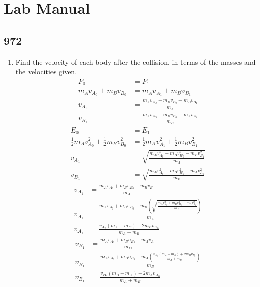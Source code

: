 \documentclass{article}
\begin{document}
\section{Lab Manual}

\subsection{972}

\begin{enumerate}[label = \textbf{(\alph*)}]
	\item Find the velocity of each body after the collision, in terms of the masses and the velocities given.
		\begin{align*}
			P_0 & = P_1 \\
			m_Av_{A_0} + m_Bv_{B_0} & = m_Av_{A_1} + m_Bv_{B_1} \\
			v_{A_1} & = \frac{ m_Av_{A_0} + m_Bv_{B_0} - m_Bv_{B_1} }{ m_A } \\
			v_{B_1} & = \frac{ m_Av_{A_0} + m_Bv_{B_0} - m_Av_{A_1} }{ m_B }
		\end{align*}
		\begin{align*}
			E_0 & = E_1 \\
			\frac{1}{2}m_Av_{A_0}^2 + \frac{1}{2}m_Bv_{B_0}^2 & = \frac{1}{2}m_Av_{A_1}^2 + \frac{1}{2}m_Bv_{B_1}^2 \\
			v_{A_1} & = \sqrt{ \frac{ m_Av_{A_0}^2 + m_Bv_{B_0}^2 - m_Bv_{B_1}^2 }{ m_A } } \\
			v_{B_1} & = \sqrt{ \frac{ m_Av_{A_0}^2 + m_Bv_{B_0}^2 - m_Av_{A_1}^2 }{ m_B } }
		\end{align*}
		\begin{align*}
			v_{A_1} & = \frac{ m_Av_{A_0} + m_Bv_{B_0} - m_Bv_{B_1} }{ m_A } \\
			v_{A_1} & = \frac{ m_Av_{A_0} + m_Bv_{B_0} - m_B \left( \sqrt{ \frac{ m_Av_{A_0}^2 + m_Bv_{B_0}^2 - m_Av_{A_1}^2 }{ m_B } } \right) }{ m_A } \\
			v_{A_1} & = \frac{ v_{A_0}(m_A - m_B) + 2m_Bv_{B_0} }{ m_A + m_B }
		\end{align*}
		\begin{align*}
			v_{B_1} & = \frac{ m_Av_{A_0} + m_Bv_{B_0} - m_Av_{A_1} }{ m_B } \\
			v_{B_1} & = \frac{ m_Av_{A_0} + m_Bv_{B_0} - m_A \left( \frac{ v_{A_0}(m_A - m_B) + 2m_Bv_{B_0} }{ m_A + m_B } \right) }{ m_B } \\
			v_{B_1} & = \frac{ v_{B_0}(m_B - m_A) + 2m_Av_{A_0} }{ m_A + m_B }
		\end{align*}
		\begin{mdframed}

\end{mdframed}
\end{enumerate}
\end{document}
